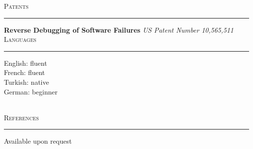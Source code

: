 \documentclass[10pt]{article}
\newcommand{\mysec}[1]{\vspace{2em}\textsc{\large #1}\vspace{1mm}\hrule\vspace{2mm}}
\newcommand{\mysub}[3]{\textbf{#1} {#2} \hfill {\em #3}}
\newcommand{\myssub}[1]{\hspace*{2mm}\parbox{163mm}{#1}\vspace*{2mm}}
\begin{document}



\mysec{Patents}
\mysub{Reverse Debugging of Software Failures}{}{\rm US Patent Number 10,565,511\vspace{2mm}} \\

\mysec{Languages}


\myssub{English: fluent \\
French: fluent \\
Turkish: native \\
German: beginner}\\

\mysec{References}

\myssub{Available upon request\\}
\end{document}
